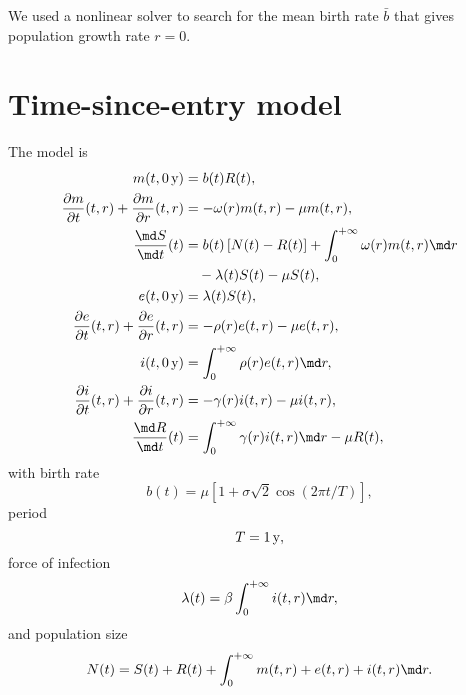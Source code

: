 \documentclass{jpmarticle}
\begin{document}
We used a nonlinear solver to search for the mean birth rate $\bar{b}$
that gives population growth rate $r = 0$.


\section{Time-since-entry model}

The model is
\begin{equation}
  \label{model_unstructured}
  \begin{split}
    m(t, \unit[0]{y}) &=
    b(t) R(t),
    \\
    \frac{\partial m}{\partial t}(t, r)
    + \frac{\partial m}{\partial r}(t, r) &=
    - \omega(r) m(t, r) - \mu m(t, r),
    \\
    \frac{\md S}{\md t}(t) &=
    b(t) \left[N(t) - R(t)\right]
    + \int_0^{+\infty} \omega(r) m(t, r) \md r
    \\ & \quad {}
    - \lambda(t) S(t) - \mu S(t),
    \\
    e(t, \unit[0]{y}) &=
    \lambda(t) S(t),
    \\
    \frac{\partial e}{\partial t}(t, r)
    + \frac{\partial e}{\partial r}(t, r) &=
    - \rho(r) e(t, r) - \mu e(t, r),
    \\
    i(t, \unit[0]{y}) &=
    \int_0^{+\infty} \rho(r) e(t, r) \md r,
    \\
    \frac{\partial i}{\partial t}(t, r)
    + \frac{\partial i}{\partial r}(t, r) &=
    - \gamma(r) i(t, r) - \mu i(t, r),
    \\
    \frac{\md R}{\md t}(t) &=
    \int_0^{+\infty} \gamma(r) i(t, r) \md r
    - \mu R(t),
  \end{split}
\end{equation}
with birth rate
\begin{equation}
  b(t) = \mu \left[
    1 + \sigma \sqrt{2} \cos\left(2 \pi t / T\right)
  \right],
\end{equation}
period
\begin{equation}
  T = \unit[1]y,
\end{equation}
force of infection
\begin{equation}
  \lambda(t) = \beta \int_0^{+\infty} i(t, r) \md r,
\end{equation}
and population size
\begin{equation}
  N(t) =
  S(t) + R(t)
  + \int_0^{+\infty} m(t, r) + e(t, r) + i(t, r) \md r.
\end{equation}
\end{document}
